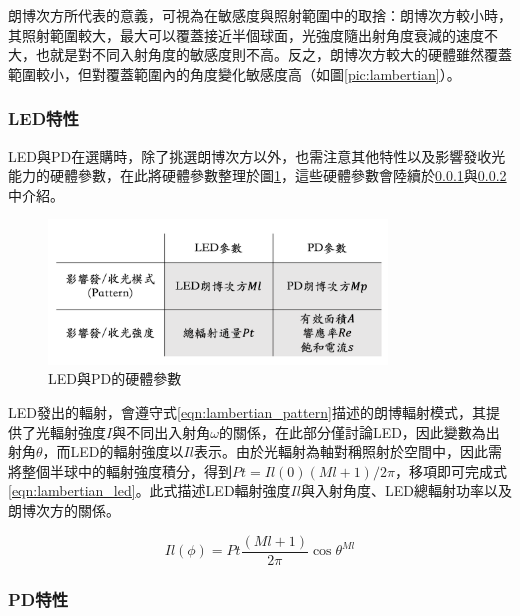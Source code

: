         朗博次方所代表的意義，可視為在敏感度與照射範圍中的取捨：朗博次方較小時，其照射範圍較大，最大可以覆蓋接近半個球面，光強度隨出射角度衰減的速度不大，也就是對不同入射角度的敏感度則不高。反之，朗博次方較大的硬體雖然覆蓋範圍較小，但對覆蓋範圍內的角度變化敏感度高（如圖\ref{pic:lambertian}）。

        

        \subsubsection{LED特性}
        \label{chp:LED}

        LED與PD在選購時，除了挑選朗博次方以外，也需注意其他特性以及影響發收光能力的硬體參數，在此將硬體參數整理於圖\ref{pic:hardware_para}，這些硬體參數會陸續於\ref{chp:LED}與\ref{chp:PD}中介紹。
        
        \begin{figure}[ht]
            \centering
            \includegraphics[width=9cm]{ch2pic/hardware_para.png}
            \caption{LED與PD的硬體參數}
            \label{pic:hardware_para}
        \end{figure}

        LED發出的輻射，會遵守式\ref{eqn:lambertian_pattern}描述的朗博輻射模式，其提供了光輻射強度$I$與不同出入射角$\omega$的關係，在此部分僅討論LED，因此變數為出射角$\theta$，而LED的輻射強度以$Il$表示。由於光輻射為軸對稱照射於空間中，因此需將整個半球中的輻射強度積分，得到$Pt = Il(0)(Ml+1)/2\pi$，移項即可完成式\ref{eqn:lambertian_led}。此式描述LED輻射強度$Il$與入射角度、LED總輻射功率以及朗博次方的關係。
        
    
        \begin{equation}
            \label{eqn:lambertian_led}
            Il(\phi)=Pt\frac{(Ml+1)}{2 \pi} \cos \theta^{Ml}
        \end{equation}





        \subsubsection{PD特性}
        \label{chp:PD}

